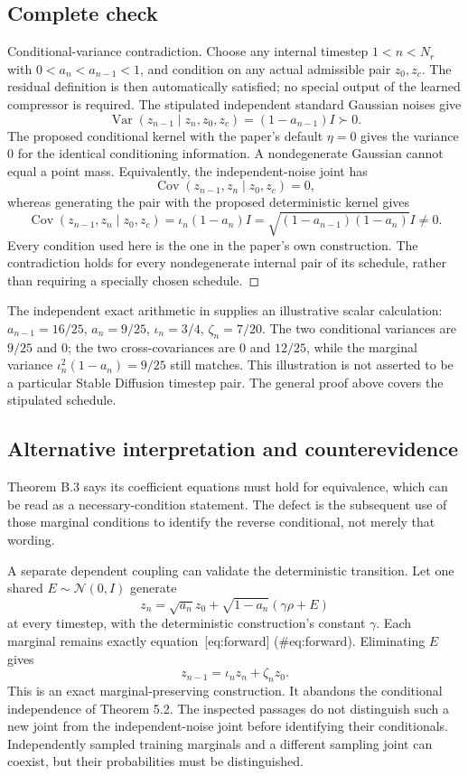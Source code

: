 \documentclass[10pt]{article}
\begin{document}
\subsection*{Complete check}
Conditional-variance contradiction. Choose any internal timestep \(1<n<N_r\) with \(0<a_n<a_{n-1}<1\), and condition on any actual admissible pair \(z_0,z_c\). The residual definition is then automatically satisfied; no special output of the learned compressor is required. The stipulated independent standard Gaussian noises give \[\operatorname{Var}(z_{n-1}\mid z_n,z_0,z_c)
 =(1-a_{n-1})I\succ0.\] The proposed conditional kernel with the paper’s default \(\eta=0\) gives the variance \(0\) for the identical conditioning information. A nondegenerate Gaussian cannot equal a point mass. Equivalently, the independent-noise joint has \[\operatorname{Cov}(z_{n-1},z_n\mid z_0,z_c)=0,\] whereas generating the pair with the proposed deterministic kernel gives \[\operatorname{Cov}(z_{n-1},z_n\mid z_0,z_c)
 =\iota_n(1-a_n)I
 =\sqrt{(1-a_{n-1})(1-a_n)}I\ne0.\] Every condition used here is the one in the paper’s own construction. The contradiction holds for every nondegenerate internal pair of its schedule, rather than requiring a specially chosen schedule. ◻\par
The independent exact arithmetic in supplies an illustrative scalar calculation: \(a_{n-1}=16/25\), \(a_n=9/25\), \(\iota_n=3/4\), \(\zeta_n=7/20\). The two conditional variances are \(9/25\) and \(0\); the two cross-covariances are \(0\) and \(12/25\), while the marginal variance \(\iota_n^2(1-a_n)=9/25\) still matches. This illustration is not asserted to be a particular Stable Diffusion timestep pair. The general proof above covers the stipulated schedule.\par
\subsection*{Alternative interpretation and counterevidence}
Theorem B.3 says its coefficient equations must hold for equivalence, which can be read as a necessary-condition statement. The defect is the subsequent use of those marginal conditions to identify the reverse conditional, not merely that wording.\par
A separate dependent coupling can validate the deterministic transition. Let one shared \(E\sim\mathcal N(0,I)\) generate \[z_n=\sqrt{a_n}z_0+\sqrt{1-a_n}(\gamma\rho+E)\] at every timestep, with the deterministic construction’s constant \(\gamma\). Each marginal remains exactly equation [eq:forward] (\#eq:forward). Eliminating \(E\) gives \[z_{n-1}=\iota_nz_n+\zeta_nz_0.\] This is an exact marginal-preserving construction. It abandons the conditional independence of Theorem 5.2. The inspected passages do not distinguish such a new joint from the independent-noise joint before identifying their conditionals. Independently sampled training marginals and a different sampling joint can coexist, but their probabilities must be distinguished.\par
\end{document}
